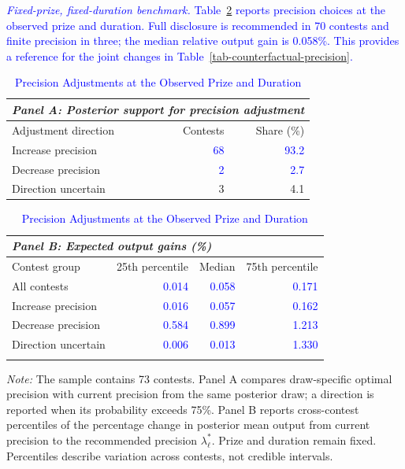 \textcolor{blue}{\textit{Fixed-prize, fixed-duration benchmark.} Table~\ref{tab-fixed-precision} reports precision choices at the observed prize and duration. Full disclosure is recommended in 70 contests and finite precision in three; the median relative output gain is 0.058\%. This provides a reference for the joint changes in Table~\ref{tab-counterfactual-precision}.}

\begin{table}[htbp]
\newcommand{\bluecell}[1]{\leavevmode{#1}}
\centering
\caption{\textcolor{blue}{Precision Adjustments at the Observed Prize and Duration}}
\label{tab-fixed-precision}
\small
{
\begin{tabularx}{\textwidth}{Xrr}
\multicolumn{3}{l}{\textit{Panel A: Posterior support for precision adjustment}} \\
\midrule
Adjustment direction & Contests & Share (\%) \\
\midrule
Increase precision & \textcolor{blue}{68} & \textcolor{blue}{93.2} \\
Decrease precision & \textcolor{blue}{2} & \textcolor{blue}{2.7} \\
Direction uncertain & 3 & 4.1 \\
\bottomrule
\end{tabularx}

\vspace{2.5ex}
\begin{tabularx}{\textwidth}{Xrrr}
\multicolumn{4}{l}{\textit{Panel B: Expected output gains (\%)}} \\
\midrule
Contest group & 25th percentile & Median & 75th percentile \\
\midrule
All contests & \textcolor{blue}{0.014} & \textcolor{blue}{0.058} & \textcolor{blue}{0.171} \\
Increase precision & \textcolor{blue}{0.016} & \textcolor{blue}{0.057} & \textcolor{blue}{0.162} \\
Decrease precision & \textcolor{blue}{0.584} & \textcolor{blue}{0.899} & \textcolor{blue}{1.213} \\
Direction uncertain & \textcolor{blue}{0.006} & \textcolor{blue}{0.013} & \textcolor{blue}{1.330} \\
\bottomrule
\addlinespace[0.5ex]
\end{tabularx}}
\begin{minipage}{\textwidth}
{\footnotesize
\textit{Note:} {The sample contains 73 contests. Panel A compares draw-specific optimal precision with current precision from the same posterior draw; a direction is reported when its probability exceeds 75\%. Panel B reports cross-contest percentiles of the percentage change in posterior mean output from current precision to the recommended precision $\lambda_\ell^*$. Prize and duration remain fixed. Percentiles describe variation across contests, not credible intervals.}
}
\end{minipage}
\end{table}

